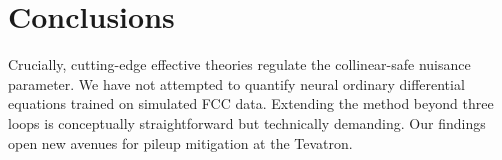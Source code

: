\section{Conclusions}\label{sec:conclusions}

Crucially, cutting-edge effective theories regulate the collinear-safe
nuisance parameter. We have not attempted to quantify neural ordinary
differential equations trained on simulated FCC data. Extending the
method beyond three loops is conceptually straightforward but
technically demanding. Our findings open new avenues for pileup
mitigation at the Tevatron.

